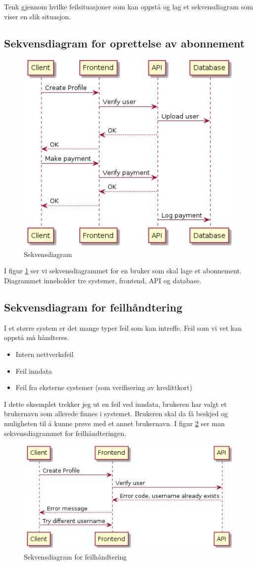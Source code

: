 \documentclass{article}
\begin{document}
Tenk gjennom hvilke feilsituasjoner som kan oppstå og lag et sekvensdiagram som viser en slik situasjon.

\subsection{Sekvensdiagram for oprettelse av abonnement}
\begin{figure}[h]
\centering
\includegraphics[scale=0.4]{images/oppgave3.png}
\caption{Sekvensdiagram}
\label{fig:oppgave3}
\end{figure}
I figur \ref{fig:oppgave3} ser vi sekvensdiagrammet for en bruker som skal lage et abonnement. Diagrammet inneholder tre systemer, frontend, API og database.

\subsection{Sekvensdiagram for feilhåndtering}
I et større system er det mange typer feil som kan intreffe. Feil som vi vet kan oppstå må håndteres.
\begin{itemize}
\item Intern nettverksfeil
\item Feil inndata
\item Feil fra eksterne systemer (som verifisering av kredittkort)
\end{itemize}

I dette eksemplet trekker jeg ut en feil ved inndata, brukeren har valgt et brukernavn som allerede finnes i systemet. Brukeren skal da få beskjed og muligheten til å kunne prøve med et annet brukernavn. I figur \ref{fig:oppgave3-2} ser man sekvensdiagrammet for feilhåndteringen.

\begin{figure}[h]
\centering
\includegraphics[scale=0.4]{images/oppgave3-2.png}
\caption{Sekvensdiagram for feilhåndtering}
\label{fig:oppgave3-2}
\end{figure}
\end{document}
